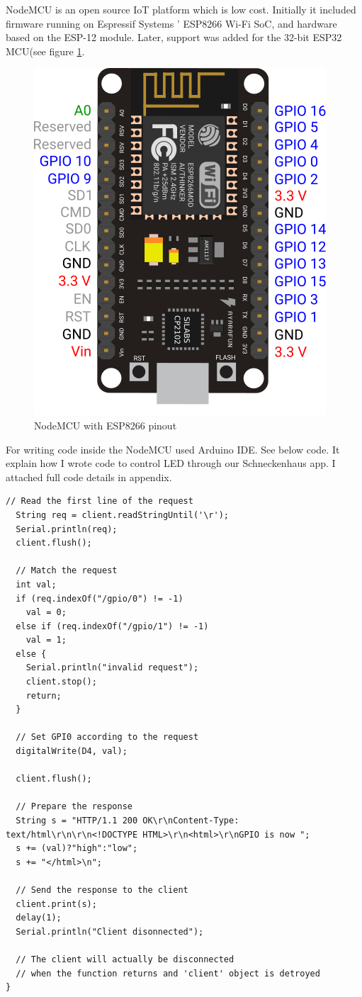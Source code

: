 NodeMCU is an open source \acs{IoT} platform which is low cost. Initially it included firmware running on Espressif Systems ' ESP8266 Wi-Fi SoC, and hardware based on the ESP-12 module. Later, support was added for the 32-bit ESP32 MCU(see figure \ref{fig:node}.
\begin{figure}[hbt!] 
  \centering
  \includegraphics[width=0.5\linewidth]{chap4/image4/Node.png}
  \caption[NodeMCU with ESP8266 pinout ]{NodeMCU with ESP8266 pinout}
  \label{fig:node}
\end{figure}
For writing code inside the NodeMCU used Arduino IDE. See below code. It explain how I wrote code to control LED through our Schneckenhaus app. I attached full code details in appendix. 

\begin{lstlisting}
// Read the first line of the request
  String req = client.readStringUntil('\r');
  Serial.println(req);
  client.flush();
  
  // Match the request
  int val;
  if (req.indexOf("/gpio/0") != -1)
    val = 0;
  else if (req.indexOf("/gpio/1") != -1)
    val = 1;
  else {
    Serial.println("invalid request");
    client.stop();
    return;
  }

  // Set GPI0 according to the request
  digitalWrite(D4, val);
  
  client.flush();

  // Prepare the response
  String s = "HTTP/1.1 200 OK\r\nContent-Type: text/html\r\n\r\n<!DOCTYPE HTML>\r\n<html>\r\nGPIO is now ";
  s += (val)?"high":"low";
  s += "</html>\n";

  // Send the response to the client
  client.print(s);
  delay(1);
  Serial.println("Client disonnected");

  // The client will actually be disconnected 
  // when the function returns and 'client' object is detroyed
}
\end{lstlisting}

